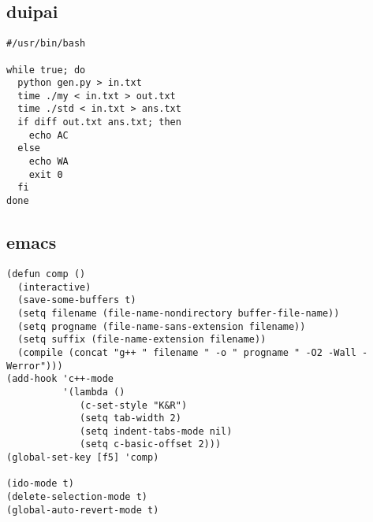\documentclass[twoside]{article}
\begin{document}
\subsection{duipai}
\begin{lstlisting}
#/usr/bin/bash

while true; do
  python gen.py > in.txt
  time ./my < in.txt > out.txt
  time ./std < in.txt > ans.txt
  if diff out.txt ans.txt; then
    echo AC
  else
    echo WA
    exit 0
  fi
done

\end{lstlisting}
\subsection{emacs}
\begin{lstlisting}
(defun comp ()
  (interactive)
  (save-some-buffers t)
  (setq filename (file-name-nondirectory buffer-file-name))
  (setq progname (file-name-sans-extension filename))
  (setq suffix (file-name-extension filename))
  (compile (concat "g++ " filename " -o " progname " -O2 -Wall -Werror")))
(add-hook 'c++-mode
          '(lambda ()
             (c-set-style "K&R")
             (setq tab-width 2)
             (setq indent-tabs-mode nil)
             (setq c-basic-offset 2)))
(global-set-key [f5] 'comp)

(ido-mode t)
(delete-selection-mode t)
(global-auto-revert-mode t)

\end{lstlisting}
\end{document}
